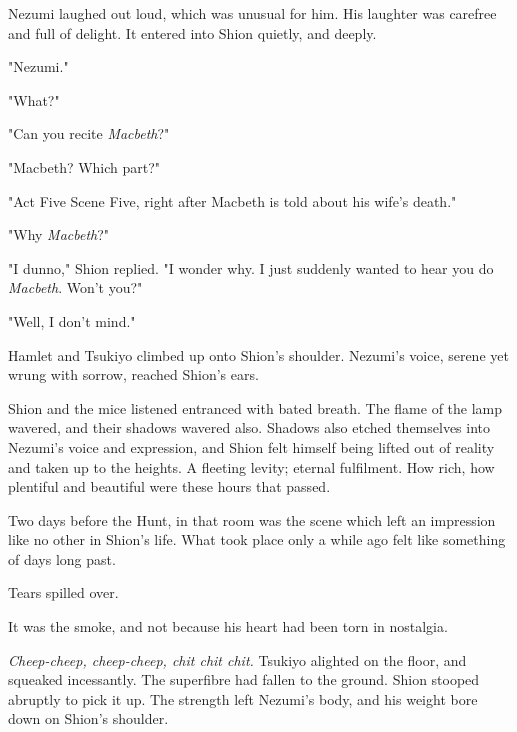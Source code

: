 Nezumi laughed out loud, which was unusual for him. His laughter was
carefree and full of delight. It entered into Shion quietly, and deeply.

"Nezumi."

"What?"

"Can you recite \emph{Macbeth}?"

"Macbeth? Which part?"

"Act Five Scene Five, right after Macbeth is told about his wife's
death."

"Why \emph{Macbeth}?"

"I dunno," Shion replied. "I wonder why. I just suddenly wanted to hear
you do \emph{Macbeth}. Won't you?"

"Well, I don't mind."

Hamlet and Tsukiyo climbed up onto Shion's shoulder. Nezumi's voice,
serene yet wrung with sorrow, reached Shion's ears.


Shion and the mice listened entranced with bated breath. The flame of
the lamp wavered, and their shadows wavered also. Shadows also etched
themselves into Nezumi's voice and expression, and Shion felt himself
being lifted out of reality and taken up to the heights. A fleeting
levity; eternal fulfilment. How rich, how plentiful and beautiful were
these hours that passed.

Two days before the Hunt, in that room was the scene which left an
impression like no other in Shion's life. What took place only a while
ago felt like something of days long past.

Tears spilled over.

It was the smoke, and not because his heart had been torn in nostalgia.

\emph{Cheep-cheep, cheep-cheep, chit chit chit.} Tsukiyo alighted on the floor,
and squeaked incessantly. The superfibre had fallen to the ground. Shion
stooped abruptly to pick it up. The strength left Nezumi's body, and his
weight bore down on Shion's shoulder.

